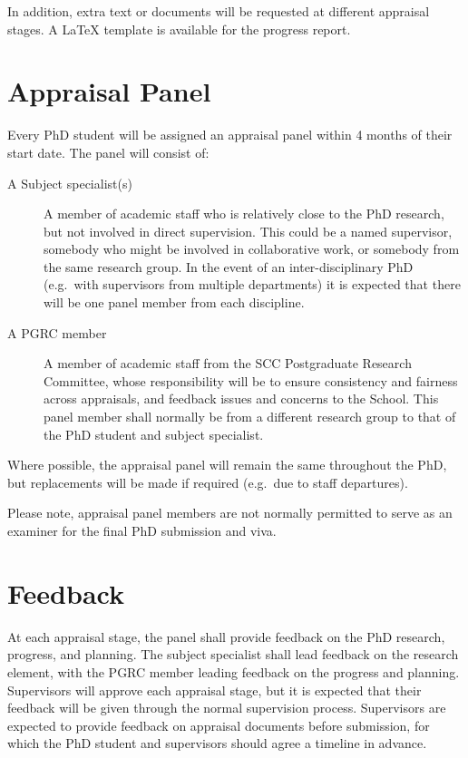\documentclass[12pt,a4paper]{article}
\begin{document}
In addition, extra text or documents will be requested at different appraisal stages. A \LaTeX{} template is available for the progress report.

\section{Appraisal Panel}
Every PhD student will be assigned an appraisal panel within 4 months of their start date. The panel will consist of:
\begin{description}
	\item[A Subject specialist(s)] A member of academic staff who is relatively close to the PhD research, but not involved in direct supervision. This could be a named supervisor, somebody who might be involved in collaborative work, or somebody from the same research group. In the event of an inter-disciplinary PhD (e.g.\ with supervisors from multiple departments) it is expected that there will be one panel member from each discipline.
	\item[A PGRC member] A member of academic staff from the SCC Postgraduate Research Committee, whose responsibility will be to ensure consistency and fairness across appraisals, and feedback issues and concerns to the School. This panel member shall normally be from a different research group to that of the PhD student and subject specialist.
\end{description}

Where possible, the appraisal panel will remain the same throughout the PhD, but replacements will be made if required (e.g.\ due to staff departures).

Please note, appraisal panel members are not normally permitted to serve as an examiner for the final PhD submission and viva.


\section{Feedback}
At each appraisal stage, the panel shall provide feedback on the PhD research, progress, and planning. The subject specialist shall lead feedback on the research element, with the PGRC member leading feedback on the progress and planning. Supervisors will approve each appraisal stage, but it is expected that their feedback will be given through the normal supervision process. Supervisors are expected to provide feedback on appraisal documents before submission, for which the PhD student and supervisors should agree a timeline in advance.
\end{document}
